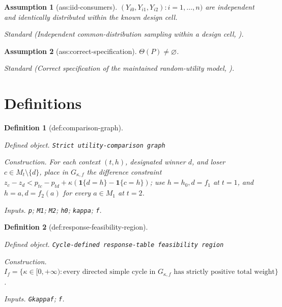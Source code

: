 \documentclass{article}
\newtheorem{assumption}{Assumption}
\newtheorem{definition}{Definition}
\begin{document}
\begin{assumption}[ass:iid-consumers]\label{ass:iid-consumers}
\((Y_{i0},Y_{i1},Y_{i2}):i=1,\ldots,n)\) are independent and identically distributed within the known design cell.
\par\smallskip\noindent\emph{Standard} (Independent common-distribution sampling within a design cell, \cite{PakesPorterShepardCalderWang2025}).
\end{assumption}

\begin{assumption}[ass:correct-specification]\label{ass:correct-specification}
\(\Theta(P)\ne\varnothing\).
\par\smallskip\noindent\emph{Standard} (Correct specification of the maintained random-utility model, \cite{Mbakop2023}).
\end{assumption}

\section{Definitions}

\begin{definition}[def:comparison-graph]\label{def:comparison-graph}
\par\smallskip\noindent\emph{Defined object.} \texttt{Strict utility-\allowbreak{}comparison graph}
\par\smallskip\noindent\emph{Construction.} For each context \((t,h)\), designated winner \(d\), and loser \(c\in M_t\setminus\{d\}\), place in \(G_{\kappa,f}\) the difference constraint \(z_c-z_d<p_{tc}-p_{td}+\kappa(\mathbf 1\{d=h\}-\mathbf 1\{c=h\})\); use \(h=h_0,d=f_1\) at \(t=1\), and \(h=a,d=f_2(a)\) for every \(a\in M_1\) at \(t=2\).
\par\smallskip\noindent\emph{Inputs.} \texttt{p}; \texttt{M1}; \texttt{M2}; \texttt{h0}; \texttt{kappa}; \texttt{f}.
\end{definition}

\begin{definition}[def:response-feasibility-region]\label{def:response-feasibility-region}
\par\smallskip\noindent\emph{Defined object.} \texttt{Cycle-\allowbreak{}defined response-\allowbreak{}table feasibility region}
\par\smallskip\noindent\emph{Construction.} \(I_f=\{\kappa\in[0,+\infty):\text{every directed simple cycle in }G_{\kappa,f}\text{ has strictly positive total weight}\}\).
\par\smallskip\noindent\emph{Inputs.} \texttt{Gkappaf}; \texttt{f}.
\end{definition}
\end{document}
